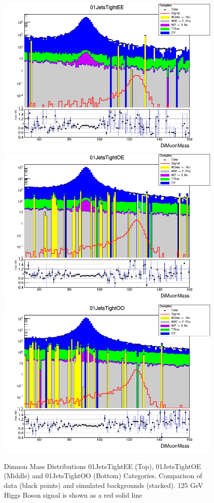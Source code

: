 \begin{figure}[htbp]
  \centering
  \includegraphics[width=0.65\linewidth]{figures/ch_higgs/distributions/baseline_kalman/distribution__01JetsTightEE__DiMuonMass__logY.png}\\
  \includegraphics[width=0.65\linewidth]{figures/ch_higgs/distributions/baseline_kalman/distribution__01JetsTightOE__DiMuonMass__logY.png}\\
  \includegraphics[width=0.65\linewidth]{figures/ch_higgs/distributions/baseline_kalman/distribution__01JetsTightOO__DiMuonMass__logY.png}
  \caption{Dimuon Mass Distributions 01JetsTightEE (Top), 01JetsTightOE (Middle) and 01JetsTightOO (Bottom) Categories. Comparison of data (black points) and simulated backgrounds (stacked). 125 GeV Higgs Boson signal is shown as a red solid line}
  \label{fig:higgs_categorization_01jetstighteeeooo}
\end{figure}
